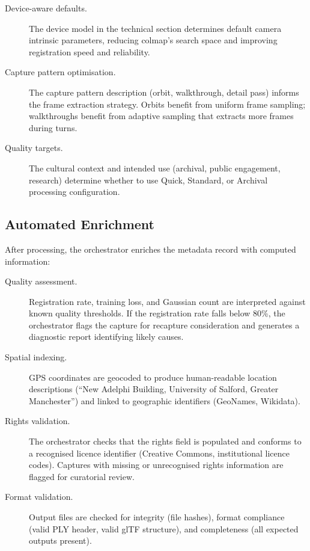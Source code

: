 \begin{description}
  \item[Device-aware defaults.] The device model in the technical section determines default camera intrinsic parameters, reducing \acrshort{colmap}'s search space and improving registration speed and reliability.
  \item[Capture pattern optimisation.] The capture pattern description (orbit, walkthrough, detail pass) informs the frame extraction strategy. Orbits benefit from uniform frame sampling; walkthroughs benefit from adaptive sampling that extracts more frames during turns.
  \item[Quality targets.] The cultural context and intended use (archival, public engagement, research) determine whether to use Quick, Standard, or Archival processing configuration.
\end{description}

\subsection{Automated Enrichment}

After processing, the orchestrator enriches the metadata record with computed information:

\begin{description}
  \item[Quality assessment.] Registration rate, training loss, and Gaussian count are interpreted against known quality thresholds. If the registration rate falls below 80\%, the orchestrator flags the capture for recapture consideration and generates a diagnostic report identifying likely causes.
  \item[Spatial indexing.] GPS coordinates are geocoded to produce human-readable location descriptions (``New Adelphi Building, University of Salford, Greater Manchester'') and linked to geographic identifiers (GeoNames, Wikidata).
  \item[Rights validation.] The orchestrator checks that the rights field is populated and conforms to a recognised licence identifier (Creative Commons, institutional licence codes). Captures with missing or unrecognised rights information are flagged for curatorial review.
  \item[Format validation.] Output files are checked for integrity (file hashes), format compliance (valid PLY header, valid glTF structure), and completeness (all expected outputs present).
\end{description}

